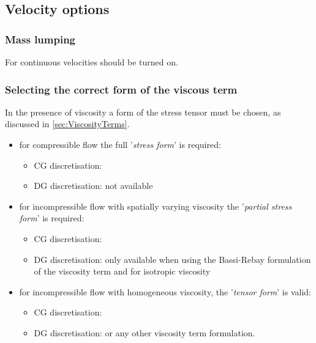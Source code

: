 \subsection{Velocity options}\label{sec:VelocityOptions}
\subsubsection{Mass lumping}
For continuous velocities  should be turned on.
\subsubsection{Selecting the correct form of the viscous term}
In the presence of viscosity a form of the stress tensor must be chosen, as discussed in \ref{sec:ViscosityTerms}.
\begin{itemize}
\item for compressible flow the full '\emph{stress form}' is required:
\begin{itemize}
\item CG discretisation: 
\item DG discretisation: not available
\end{itemize}
\item for incompressible flow with spatially varying viscosity the '\emph{partial stress form}' is required:
\begin{itemize}
\item CG discretisation: 
\item DG discretisation: only available when using the Bassi-Rebay formulation of the viscosity term and for isotropic viscosity 
\end{itemize}
\item for incompressible flow with homogeneous viscosity, the '\emph{tensor form}' is valid:
\begin{itemize}
\item CG discretisation: 
\item DG discretisation:  or any other viscosity term formulation.
\end{itemize}
\end{itemize}

